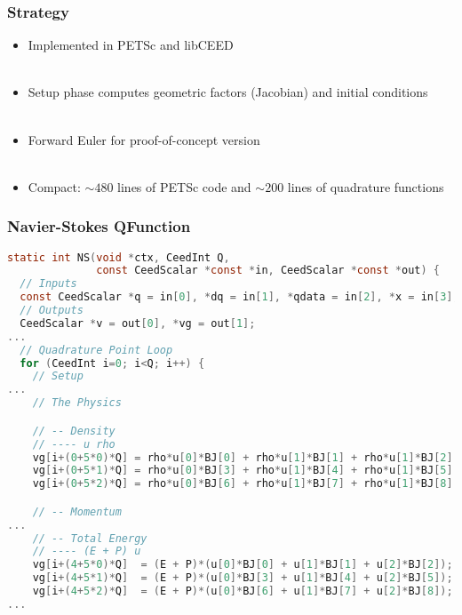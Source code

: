 \documentclass{beamer}
\begin{document}
\begin{frame}
\begin{center}
\frametitle{Strategy}

\begin{itemize}

\item Implemented in PETSc and libCEED\\

~\\

\item Setup phase computes geometric factors (Jacobian) and initial conditions\\

~\\

\item Forward Euler for proof-of-concept version\\

~\\

\item Compact: $\sim 480$ lines of PETSc code and $\sim 200$ lines of quadrature functions

\end{itemize}

\end{center}
\end{frame}


\begin{frame}[fragile]
\begin{center}
\frametitle{Navier-Stokes QFunction}

{\tiny
\begin{lstlisting}[language=C]
static int NS(void *ctx, CeedInt Q,
              const CeedScalar *const *in, CeedScalar *const *out) {
  // Inputs
  const CeedScalar *q = in[0], *dq = in[1], *qdata = in[2], *x = in[3];
  // Outputs
  CeedScalar *v = out[0], *vg = out[1];
...
  // Quadrature Point Loop
  for (CeedInt i=0; i<Q; i++) {
    // Setup
...
    // The Physics

    // -- Density
    // ---- u rho
    vg[i+(0+5*0)*Q] = rho*u[0]*BJ[0] + rho*u[1]*BJ[1] + rho*u[1]*BJ[2];
    vg[i+(0+5*1)*Q] = rho*u[0]*BJ[3] + rho*u[1]*BJ[4] + rho*u[1]*BJ[5];
    vg[i+(0+5*2)*Q] = rho*u[0]*BJ[6] + rho*u[1]*BJ[7] + rho*u[1]*BJ[8];

    // -- Momentum
...
    // -- Total Energy
    // ---- (E + P) u
    vg[i+(4+5*0)*Q]  = (E + P)*(u[0]*BJ[0] + u[1]*BJ[1] + u[2]*BJ[2]);
    vg[i+(4+5*1)*Q]  = (E + P)*(u[0]*BJ[3] + u[1]*BJ[4] + u[2]*BJ[5]);
    vg[i+(4+5*2)*Q]  = (E + P)*(u[0]*BJ[6] + u[1]*BJ[7] + u[2]*BJ[8]);
...
\end{lstlisting}
}

\end{center}
\end{frame}
\end{document}
